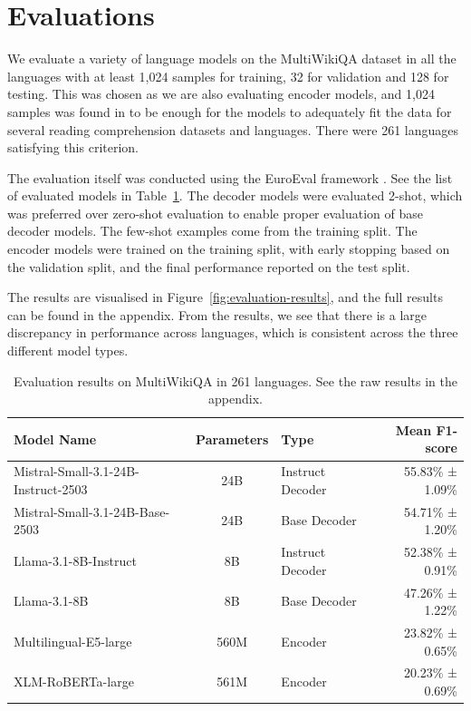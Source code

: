 \documentclass[10pt, a4paper]{article}
\begin{document}
\section{Evaluations}
\label{sec:evaluations}

We evaluate a variety of language models on the MultiWikiQA dataset in all the languages with at least 1,024 samples for training, 32 for validation and 128 for testing. This was chosen as we are also evaluating encoder models, and 1,024 samples was found in \citet{nielsen-2023-scandeval} to be enough for the models to adequately fit the data for several reading comprehension datasets and languages. There were 261 languages satisfying this criterion.

The evaluation itself was conducted using the EuroEval framework \cite{nielsen-2023-scandeval,saattrup-nielsen-etal-2025-encoder}. See the list of evaluated models in Table~\ref{tab:evaluated-models}. The decoder models were evaluated 2-shot, which was preferred over zero-shot evaluation to enable proper evaluation of base decoder models. The few-shot examples come from the training split. The encoder models were trained on the training split, with early stopping based on the validation split, and the final performance reported on the test split.

The results are visualised in Figure~\ref{fig:evaluation-results}, and the full results can be found in the appendix. From the results, we see that there is a large discrepancy in performance across languages, which is consistent across the three different model types.

\begin{table}[!htb]
    \centering
    \small
    \begin{tabular}{lclr}
        \hline
        \textbf{Model Name} & \textbf{Parameters} & \textbf{Type} & \textbf{Mean F1-score} \\
        \hline
        Mistral-Small-3.1-24B-Instruct-2503 \cite{mistralsmall2025} & 24B & Instruct Decoder & 55.83\% ± 1.09\% \\
        Mistral-Small-3.1-24B-Base-2503 \cite{mistralsmall2025} & 24B & Base Decoder & 54.71\% ± 1.20\% \\
        Llama-3.1-8B-Instruct \cite{grattafiori2024llama} & 8B & Instruct Decoder & 52.38\% ± 0.91\% \\
        Llama-3.1-8B \cite{grattafiori2024llama} & 8B & Base Decoder & 47.26\% ± 1.22\% \\
        Multilingual-E5-large \cite{wang2024multilingual} & 560M & Encoder & 23.82\% ± 0.65\% \\
        XLM-RoBERTa-large \cite{ruder2019unsupervised} & 561M & Encoder & 20.23\% ± 0.69\% \\
        \hline
    \end{tabular}
    \caption{Evaluation results on MultiWikiQA in 261 languages. See the raw results in the appendix.}
    \label{tab:evaluated-models}
\end{table}
\end{document}
